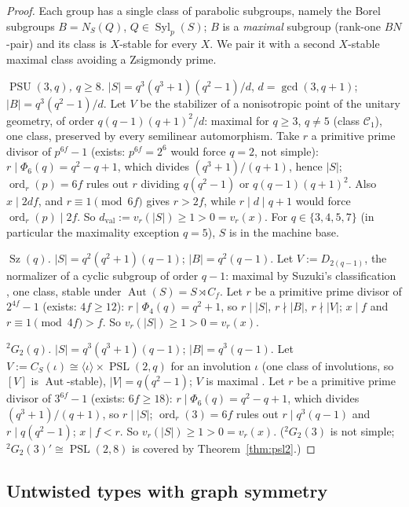 \documentclass[11pt]{amsart}
\theoremstyle{definition}
\theoremstyle{remark}
\DeclareMathOperator{\Aut}{Aut}
\DeclareMathOperator{\Syl}{Syl}
\DeclareMathOperator{\PSL}{PSL}
\DeclareMathOperator{\PSU}{PSU}
\DeclareMathOperator{\Sz}{Sz}
\DeclareMathOperator{\ord}{ord}
\newcommand{\vp}[1]{v_{#1}}
\begin{document}
\begin{proof}
Each group has a single class of parabolic subgroups, namely the Borel
subgroups $B=N_S(Q)$, $Q\in\Syl_p(S)$; $B$ is a \emph{maximal}
subgroup (rank-one $BN$-pair) and its class is $X$-stable for every $X$.
We pair it with a second $X$-stable maximal class avoiding a Zsigmondy
prime.

\emph{$\PSU(3,q)$, $q\geq8$.} $|S|=q^3(q^3+1)(q^2-1)/d$,
$d=\gcd(3,q+1)$; $|B|=q^3(q^2-1)/d$. Let $V$ be the stabilizer of a
nonisotropic point of the unitary geometry, of order $q(q-1)(q+1)^2/d$:
maximal for $q\geq3$, $q\neq5$ \cite[Table~8.5]{BHRD} (class
$\mathcal{C}_1$), one class, preserved by every semilinear
automorphism. Take $r$ a primitive prime divisor of $p^{6f}-1$ (exists:
$p^{6f}=2^6$ would force $q=2$, not simple): $r\mid\Phi_6(q)=q^2-q+1$,
which divides $(q^3+1)/(q+1)$, hence $|S|$; $\ord_r(p)=6f$ rules out
$r$ dividing $q(q^2-1)$ or $q(q-1)(q+1)^2$. Also $x\mid2df$, and
$r\equiv1\pmod{6f}$ gives $r>2f$, while $r\mid d\mid q+1$ would force
$\ord_r(p)\mid2f$. So $d_{\mathrm{val}}:=\vp{r}(|S|)\geq1>0=\vp{r}(x)$.
For $q\in\{3,4,5,7\}$ (in particular the maximality exception $q=5$),
$S$ is in the machine base.

\emph{$\Sz(q)$.} $|S|=q^2(q^2+1)(q-1)$; $|B|=q^2(q-1)$. Let
$V:=D_{2(q-1)}$, the normalizer of a cyclic subgroup of order $q-1$:
maximal by Suzuki's classification \cite{Suzuki1962}, one class, stable
under $\Aut(S)=S\rtimes C_f$. Let $r$ be a primitive prime divisor of
$2^{4f}-1$ (exists: $4f\geq12$): $r\mid\Phi_4(q)=q^2+1$, so $r\mid|S|$,
$r\nmid|B|$, $r\nmid|V|$; $x\mid f$ and $r\equiv1\pmod{4f}>f$. So
$\vp{r}(|S|)\geq1>0=\vp{r}(x)$.

\emph{${}^2G_2(q)$.} $|S|=q^3(q^3+1)(q-1)$; $|B|=q^3(q-1)$. Let
$V:=C_S(\iota)\cong\langle\iota\rangle\times\PSL(2,q)$ for an involution
$\iota$ (one class of involutions, so $[V]$ is $\Aut$-stable),
$|V|=q(q^2-1)$; $V$ is maximal \cite{Kleidman1988}. Let $r$ be a
primitive prime divisor of $3^{6f}-1$ (exists: $6f\geq18$):
$r\mid\Phi_6(q)=q^2-q+1$, which divides $(q^3+1)/(q+1)$, so $r\mid|S|$;
$\ord_r(3)=6f$ rules out $r\mid q^3(q-1)$ and $r\mid q(q^2-1)$;
$x\mid f<r$. So $\vp{r}(|S|)\geq1>0=\vp{r}(x)$.
(${}^2G_2(3)$ is not simple; ${}^2G_2(3)'\cong\PSL(2,8)$ is covered by
Theorem~\ref{thm:psl2}.)
\end{proof}

\subsection{Untwisted types with graph symmetry}
\end{document}

